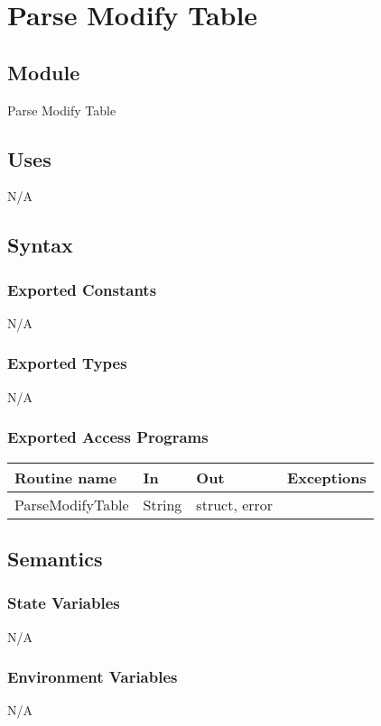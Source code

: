 \documentclass[12pt]{article}
\begin{document}
{\color{red}\section{Parse Modify Table}

\subsection{Module}
Parse Modify Table

\subsection{Uses}
N/A

\subsection{Syntax}
\subsubsection{Exported Constants}
N/A

\subsubsection{Exported Types}
N/A

\subsubsection{Exported Access Programs}
\begin{tabular}{| l | l | l | l |}
\hline
\textbf{Routine name} & \textbf{In} & \textbf{Out} & \textbf{Exceptions}\\
\hline
{\color{red}ParseModifyTable} & {\color{red}String} & {\color{red}struct, error} & \\
\hline
\end{tabular}

\subsection{Semantics}
\subsubsection{State Variables}
N/A

\subsubsection{Environment Variables}
N/A

}
\end{document}

